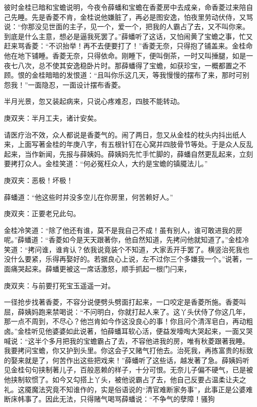 \begin{parag}
    彼时金桂已暗和宝蟾说明，今夜令薛蟠和宝蟾在香菱房中去成亲，命香菱过来陪自己先睡。先是香菱不肯，金桂说他嫌脏了，再必是图安逸，怕夜里劳动伏侍，又骂说：“你那没见世面的主子，见一个，爱一个，把我的人霸占了去，又不叫你来。到底是什么主意，想必是逼我死罢了。”薛蟠听了这话，又怕闹黄了宝蟾之事，忙又赶来骂香菱：“不识抬举！再不去便要打了！”香菱无奈，只得抱了铺盖来。金桂命他在地下铺睡。香菱无奈，只得依命。刚睡下，便叫倒茶，一时又叫捶腿，如是一夜七八次，总不使其安逸稳卧片时。那薛蟠得了宝蟾，如获珍宝，一概都置之不顾。恨的金桂暗暗的发恨道：“且叫你乐这几天，等我慢慢的摆布了来，那时可别怨我！”一面隐忍，一面设计摆布香菱。
\end{parag}


\begin{parag}
    半月光景，忽又装起病来，只说心疼难忍，四肢不能转动。\begin{note}庚双夹：半月工夫，诸计安矣。\end{note}请医疗治不效，众人都说是香菱气的。闹了两日，忽又从金桂的枕头内抖出纸人来，上面写著金桂的年庚八字，有五根针钉在心窝并四肢骨节等处。于是众人反乱起来，当作新闻，先报与薛姨妈。薛姨妈先忙手忙脚的，薛蟠自然更乱起来，立刻要拷打众人。金桂笑道：“何必冤枉众人，大约是宝蟾的镇魇法儿。”\begin{note}庚双夹：恶极！坏极！\end{note}薛蟠道：“他这些时并没多空儿在你房里，何苦赖好人。”\begin{note}庚双夹：正要老兄此句。\end{note}金桂冷笑道：“除了他还有谁，莫不是我自己不成！虽有别人，谁可敢进我的房呢。”薛蟠道：“香菱如今是天天跟著你，他自然知道，先拷问他就知道了。”金桂冷笑道：“拷问谁，谁肯认？依我说竟装个不知道，大家丢开手罢了。横竖治死我也没什么要紧，乐得再娶好的。若据良心上说，左不过你三个多嫌我一个。”说著，一面痛哭起来。薛蟠更被这一席话激怒，顺手抓起一根门闩来，\begin{note}庚双夹：与前要打死宝玉遥遥一对。\end{note}一径抢步找著香菱，不容分说便劈头劈面打起来，一口咬定是香菱所施。香菱叫屈，薛姨妈跑来禁喝说：“不问明白，你就打起人来了。这丫头伏侍了你这几年，那一点不周到，不尽心？他岂肯如今作这没良心的事！你且问个清浑皂白，再动粗卤。”金桂听见他婆婆如此说著，怕薛蟠耳软心活，便益发嚎啕大哭起来，一面又哭喊说：“这半个多月把我的宝蟾霸占了去，不容他进我的房，唯有秋菱跟著我睡。我要拷问宝蟾，你又护到头里。你这会子又赌气打他去。治死我，再拣富贵的标致的娶来就是了，何苦作出这些把戏来！”薛蟠听了这些话，越发著了急。薛姨妈听见金桂句句挟制著儿子，百般恶赖的样子，十分可恨。无奈儿子偏不硬气，已是被他挟制软惯了。如今又勾搭上丫头，被他说霸占了去，他自己反要占温柔让夫之礼。这魇魔法究竟不知谁作的，实是俗语说的“清官难断家务事”，此事正是公婆难断床帏事了。因此无法，只得赌气喝骂薛蟠说：“不争气的孽障！骚狗
\end{parag}
